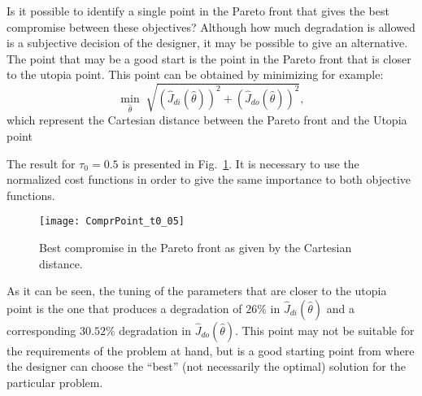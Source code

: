 Is it possible to identify a single point in the Pareto front that gives the best compromise between these objectives? Although how much degradation is allowed is a subjective decision of the designer, it may be possible to give an alternative. The point that may be a good start is the point in the Pareto front that is closer to the utopia point. This point can be obtained by minimizing for example:
%
\begin{equation}
\min_{\hat{\theta}}{\; \sqrt{\left( \hat{J}_{di}(\hat{\theta})\right) ^2+\left( \hat{J}_{do}(\hat{\theta})\right)^2}},
\label{eq:Compr}
\end{equation}
%
which represent the Cartesian distance between the Pareto front and the Utopia point

The result for $\tau_0=0.5$ is presented in Fig.~\ref{fig:ComprPoint_t0_05}. It is necessary to use the normalized cost functions in order to give the same importance to both objective functions. 
%
\begin{figure}[tb]
\centering
\texttt{[image: ComprPoint\_t0\_05]}
\caption{Best compromise in the Pareto front as given by the Cartesian distance.}
\label{fig:ComprPoint_t0_05}
\end{figure}
As it can be seen, the tuning of the parameters that are closer to the utopia point is the one that produces a degradation of $26\%$ in $\hat{J}_{di}(\hat{\theta})$ and a corresponding $30.52\%$ degradation in $\hat{J}_{do}(\hat{\theta})$. This point may not be suitable for the requirements of the problem at hand, but is a good starting point from where the designer can choose the ``best'' (not necessarily the optimal) solution for the particular problem.

